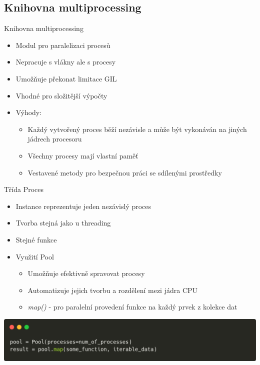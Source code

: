 \documentclass{beamer}
\begin{document}
\subsection{Knihovna multiprocessing}
\begin{frame}{Knihovna multiprocessing}
    \begin{itemize}
        \item Modul pro paralelizaci procesů
        \item Nepracuje s vlákny ale s procesy
        \item Umožňuje překonat limitace GIL
        \item Vhodné pro složitější výpočty
        
        \vskip 0.3in
        \item Výhody:
        \begin{itemize}
            \item Každý vytvořený proces běží nezávisle a může být vykonáván na jiných jádrech procesoru
            \item Všechny procesy mají vlastní paměť
            \item Vestavené metody pro bezpečnou práci se sdílenými prostředky
        \end{itemize}
    \end{itemize}
\end{frame}

\begin{frame}[fragile]{Třída Proces}
    \begin{itemize}
        \item Instance reprezentuje jeden nezávislý proces
        \item Tvorba stejná jako u threading
        \item Stejné funkce
        \vskip 0.25in

        \item Využití Pool
        \begin{itemize}
            \item Umožňuje efektivně spravovat procesy
            \item Automatizuje jejich tvorbu a rozdělení mezi jádra CPU
            \item \textit{map()} - pro paralelní provedení funkce na každý prvek z kolekce dat
        \end{itemize}
    \end{itemize}
    \scriptsize

    \begin{center}
        \includegraphics[width=\textwidth]{obrazky/codes/carbon7.png}
    \end{center}
\end{frame}
\end{document}
